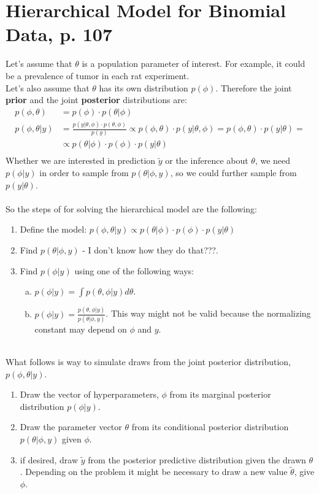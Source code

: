 \documentclass[]{article}
\begin{document}
\section{Hierarchical Model for Binomial Data, p. 107}
Let's assume that $\theta$ is a population parameter of interest. For example, it could be a prevalence of tumor in each rat experiment.\\
Let's also assume that $\theta$ has its own distribution $p(\phi)$. Therefore the joint \textbf{prior} and the joint \textbf{posterior} distributions are:
$$
\begin{aligned}
  p(\phi, \theta) &= p(\phi)\cdot p(\theta|\phi)\\
  p(\phi, \theta|y) &= \frac{p(y|\theta, \phi)\cdot p(\theta, \phi)}{p(y)} \propto p(\phi, \theta)\cdot p(y|\theta, \phi)= p(\phi, \theta)\cdot p(y|\theta) =\\
	&\propto p(\theta|\phi)\cdot p(\phi) \cdot p(y|\theta)\\
\end{aligned}
$$
Whether we are interested in prediction $\tilde{y}$ or the inference about $\theta$, we need $p(\phi|y)$ in order to sample from $p(\theta|\phi,y)$, so we could further sample from $p(y|\theta)$.\\
~\\
So the steps of for solving the hierarchical model are the following:
\begin{enumerate}[1)]
	\item Define the model: $p(\phi, \theta|y)\propto p(\theta|\phi)\cdot p(\phi) \cdot p(y|\theta)$
	\item Find $p(\theta|\phi,y)$ - I don't know how they do that???.
	\item Find $p(\phi|y)$ using one of the following ways:
	\begin{enumerate}[a)]
		\item $p(\phi|y) = \int p(\theta,\phi|y)d\theta$.
		\item $p(\phi|y) = \frac{p(\theta,\phi|y)}{p(\theta|\phi,y)}$. This way might not be valid because the normalizing constant may depend on $\phi$ and $y$.
	\end{enumerate}
\end{enumerate}
~\\
What follows is way to simulate draws from the joint posterior distribution, $p(\phi, \theta|y)$.
\begin{enumerate}[1)]
	\item Draw the vector of hyperparameters, $\phi$ from its marginal posterior distribution $p(\phi|y)$.
	\item Draw the parameter vector $\theta$ from its conditional posterior distribution $p(\theta|\phi,y)$ given $\phi$.
	\item if desired, draw $\tilde{y}$ from the posterior predictive distribution given the drawn $\theta$. Depending on the problem it might be necessary to draw a new value $\tilde{\theta}$, give $\phi$.
\end{enumerate}
\end{document}
